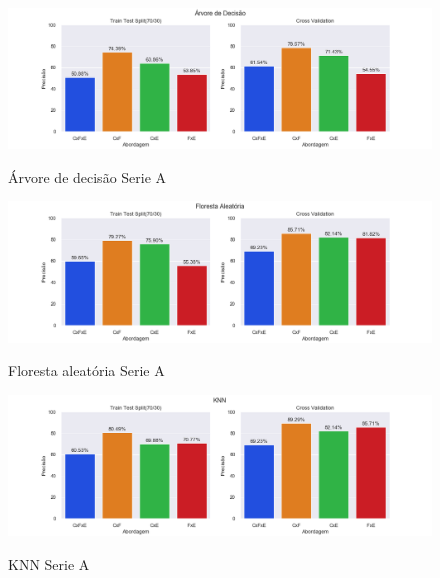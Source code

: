 \begin{figure}[htbp]
  \begin{center}
  \includegraphics[width=1.05\linewidth]{imagens/resultados/arvore_decisao_sa.png}\\
  \end{center}
  \caption[Árvore de decisão Serie A]{Árvore de decisão Serie A}
  \label{fig:logo}
\end{figure}

\begin{figure}[htbp]
  \begin{center}
  \includegraphics[width=1.05\linewidth]{imagens/resultados/floresta_aleatoria_sa.png}\\
  \end{center}
  \caption[Floresta aleatória Serie A]{Floresta aleatória Serie A}
  \label{fig:logo}
\end{figure}

\begin{figure}[htbp]
  \begin{center}
  \includegraphics[width=1.05\linewidth]{imagens/resultados/knn_sa.png}\\
  \end{center}
  \caption[KNN Serie A]{KNN Serie A}
  \label{fig:logo}
\end{figure}

